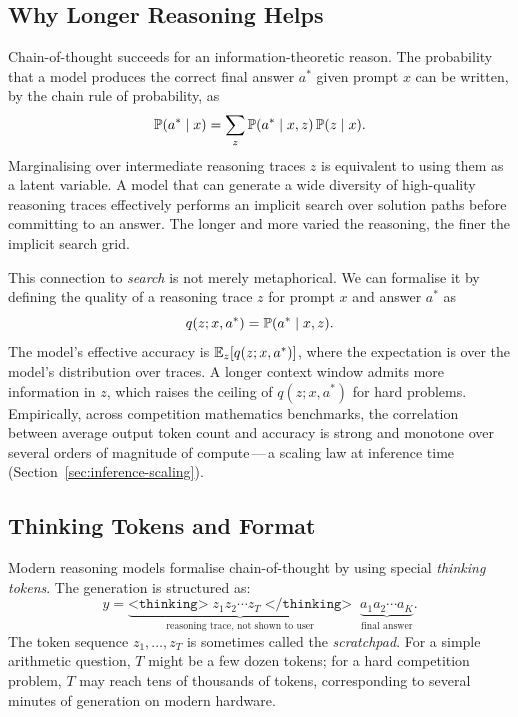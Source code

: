 \subsection{Why Longer Reasoning Helps}
\label{subsec:why-cot-helps}

Chain-of-thought succeeds for an information-theoretic reason.
The probability that a model produces the correct final answer $a^*$
given prompt $x$ can be written, by the chain rule of probability, as
\begin{equation}
\label{eq:cot-chain-rule}
\mathbb{P}(a^* \mid x)
  = \sum_{z} \mathbb{P}(a^* \mid x, z)\,\mathbb{P}(z \mid x).
\end{equation}
Marginalising over intermediate reasoning traces $z$ is equivalent to
using them as a latent variable. A model that can generate a wide
diversity of high-quality reasoning traces effectively performs an
implicit search over solution paths before committing to an answer.
The longer and more varied the reasoning, the finer the implicit
search grid.

This connection to \emph{search} is not merely
metaphorical. We can formalise it by defining the quality of a
reasoning trace $z$ for prompt $x$ and answer $a^*$ as
\[
q(z; x, a^*) = \mathbb{P}(a^* \mid x, z).
\]
The model's effective accuracy is $\operatorname{\mathbb{E}}_z[q(z; x, a^*)]$, where
the expectation is over the model's distribution over traces. A longer
context window admits more information in $z$, which raises the
ceiling of $q(z; x, a^*)$ for hard problems. Empirically, across
competition mathematics benchmarks, the correlation between average
output token count and accuracy is strong and monotone over several
orders of magnitude of compute\,---\,a scaling law at inference time
(Section~\ref{sec:inference-scaling}).

\subsection{Thinking Tokens and Format}
\label{subsec:thinking-tokens}

Modern reasoning models formalise chain-of-thought by using special
\emph{thinking tokens}. The generation is
structured as:
\begin{equation}
\label{eq:thinking-format}
y = \underbrace{\texttt{<thinking>}\; z_1 z_2 \cdots z_T
                \;\texttt{</thinking>}}_{\text{reasoning trace, not shown to user}}
    \;\;\underbrace{a_1 a_2 \cdots a_K}_{\text{final answer}}.
\end{equation}
The token sequence $z_1, \ldots, z_T$ is sometimes called the
\emph{scratchpad}. For a simple arithmetic
question, $T$ might be a few dozen tokens; for a hard competition
problem, $T$ may reach tens of thousands of tokens, corresponding to
several minutes of generation on modern hardware.

